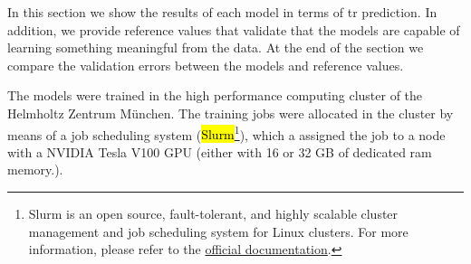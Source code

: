 
\glsresetall
\graphicspath{{./Sections/Results/Resources/}}

In this section we show the results of each model in terms of \gls{tr} prediction. In addition, we provide reference values that validate that the models are capable of learning something meaningful from the data.
At the end of the section we compare the validation errors between the models and reference values.

The models were trained in the high performance computing cluster of the Helmholtz Zentrum München.
The training jobs were allocated in the cluster by means of a job scheduling system (\hl{Slurm}\footnote{Slurm is an open source, fault-tolerant, and highly scalable cluster management and job scheduling system for Linux clusters. For more information, please refer to the \href{https://slurm.schedmd.com/overview.html}{official documentation}.}), which a assigned the job to a node with a NVIDIA Tesla V100 GPU (either with 16 or 32 GB of dedicated ram memory.).
